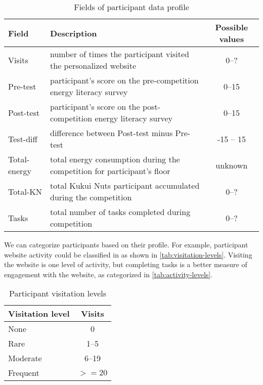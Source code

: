 \begin{table}[htbp]
	\centering
		\begin{tabular}{| l | p{8cm} | c |}
			\hline
			Field & Description & Possible values \\ \hline
			
			Visits & number of times the participant visited the personalized website & 0--? \\ \hline
	
			Pre-test & participant's score on the pre-competition energy literacy survey & 0--15 \\ \hline

			Post-test & participant's score on the post-competition energy literacy survey & 0--15 \\ \hline
	
			Test-diff & difference between Post-test minus Pre-test & -15 -- 15 \\ \hline

			Total-energy & total energy consumption during the competition for participant's floor & unknown \\ \hline
			
			Total-KN & total Kukui Nuts participant accumulated during the competition  & 0--? \\ \hline

			Tasks & total number of tasks completed during competition & 0--? \\ \hline

		\end{tabular}
	\caption{Fields of participant data profile}
	\label{tab:participant-profile}
\end{table}

We can categorize participants based on their profile. For example, participant website activity could be classified in as shown in \autoref{tab:visitation-levels}. Visiting the website is one level of activity, but completing tasks is a better measure of engagement with the website, as categorized in \autoref{tab:activity-levels}.

\begin{table}[htbp]
	\centering
		\begin{tabular}{| l | c |}
			\hline
			Visitation level & Visits \\ \hline
			
			None & 0 \\ \hline
	
			Rare & 1--5 \\ \hline

			Moderate & 6--19 \\ \hline

			Frequent & $>= 20$ \\ \hline

		\end{tabular}
	\caption{Participant visitation levels}
	\label{tab:visitation-levels}
\end{table}


